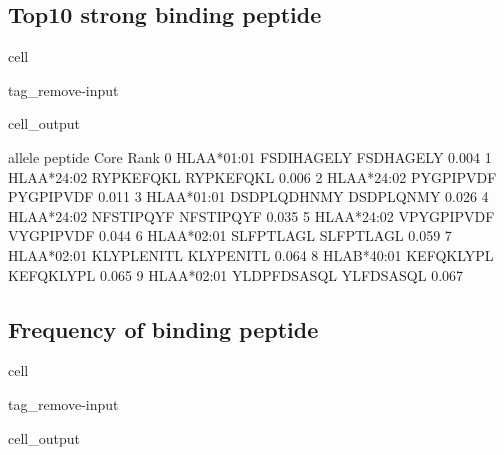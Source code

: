 \documentclass[letterpaper,10pt,english]{jupyterBook}
\begin{document}
\subsection{Top10 strong binding peptide}
\label{\detokenize{ipynb/chapter2:top10-strong-binding-peptide}}
\begin{sphinxuseclass}{cell}
\begin{sphinxuseclass}{tag_remove-input}\begin{sphinxVerbatimOutput}

\begin{sphinxuseclass}{cell_output}
\begin{sphinxVerbatim}[commandchars=\\\{\}]
        allele      peptide       Core   Rank
0  HLA\PYGZhy{}A*01:01   FSDIHAGELY  FSDHAGELY  0.004
1  HLA\PYGZhy{}A*24:02    RYPKEFQKL  RYPKEFQKL  0.006
2  HLA\PYGZhy{}A*24:02    PYGPIPVDF  PYGPIPVDF  0.011
3  HLA\PYGZhy{}A*01:01  DSDPLQDHNMY  DSDPLQNMY  0.026
4  HLA\PYGZhy{}A*24:02    NFSTIPQYF  NFSTIPQYF  0.035
5  HLA\PYGZhy{}A*24:02   VPYGPIPVDF  VYGPIPVDF  0.044
6  HLA\PYGZhy{}A*02:01    SLFPTLAGL  SLFPTLAGL  0.059
7  HLA\PYGZhy{}A*02:01   KLYPLENITL  KLYPENITL  0.064
8  HLA\PYGZhy{}B*40:01    KEFQKLYPL  KEFQKLYPL  0.065
9  HLA\PYGZhy{}A*02:01  YLDPFDSASQL  YLFDSASQL  0.067
\end{sphinxVerbatim}

\end{sphinxuseclass}\end{sphinxVerbatimOutput}

\end{sphinxuseclass}
\end{sphinxuseclass}

\subsection{Frequency of binding peptide}
\label{\detokenize{ipynb/chapter2:frequency-of-binding-peptide}}
\begin{sphinxuseclass}{cell}
\begin{sphinxuseclass}{tag_remove-input}\begin{sphinxVerbatimOutput}

\begin{sphinxuseclass}{cell_output}
\noindent{}

\end{sphinxuseclass}\end{sphinxVerbatimOutput}

\end{sphinxuseclass}
\end{sphinxuseclass}
\end{document}
